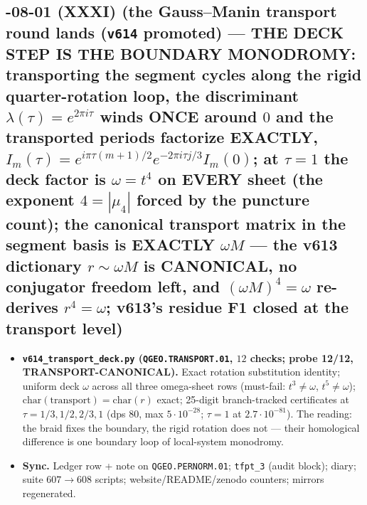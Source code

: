 \subsection*{-08-01 (XXXI) (the Gauss--Manin transport round lands (\texttt{v614} promoted) --- THE DECK STEP IS THE BOUNDARY MONODROMY: transporting the segment cycles along the rigid quarter-rotation loop, the discriminant $\lambda(\tau)=e^{2\pi i\tau}$ winds ONCE around $0$ and the transported periods factorize EXACTLY, $I_m(\tau)=e^{i\pi\tau(m+1)/2}e^{-2\pi i\tau j/3}I_m(0)$; at $\tau=1$ the deck factor is $\omega=t^4$ on EVERY sheet (the exponent $4=|\mu_4|$ forced by the puncture count); the canonical transport matrix in the segment basis is EXACTLY $\omega M$ --- the v613 dictionary $r\sim\omega M$ is CANONICAL, no conjugator freedom left, and $(\omega M)^4=\omega$ re-derives $r^4=\omega$; v613's residue F1 closed at the transport level)}
\begin{itemize}[leftmargin=1.5em]
\item \textbf{\texttt{v614\_transport\_deck.py} (\texttt{QGEO.TRANSPORT.01}, $12$ checks;
probe 12/12, TRANSPORT-CANONICAL).} Exact rotation substitution identity; uniform deck
$\omega$ across all three omega-sheet rows (must-fail: $t^3\ne\omega$, $t^5\ne\omega$);
$\mathrm{char}(\mathrm{transport})=\mathrm{char}(r)$ exact; 25-digit branch-tracked
certificates at $\tau=1/3,1/2,2/3,1$ (dps $80$, max $5{\cdot}10^{-28}$; $\tau=1$ at
$2.7{\cdot}10^{-81}$).  The reading: the braid fixes the boundary, the rigid rotation
does not --- their homological difference is one boundary loop of local-system
monodromy.
\item \textbf{Sync.} Ledger row + note on \texttt{QGEO.PERNORM.01}; \texttt{tfpt\_3}
(audit block); diary; suite $607\to608$ scripts; website/README/zenodo counters;
mirrors regenerated.
\end{itemize}

